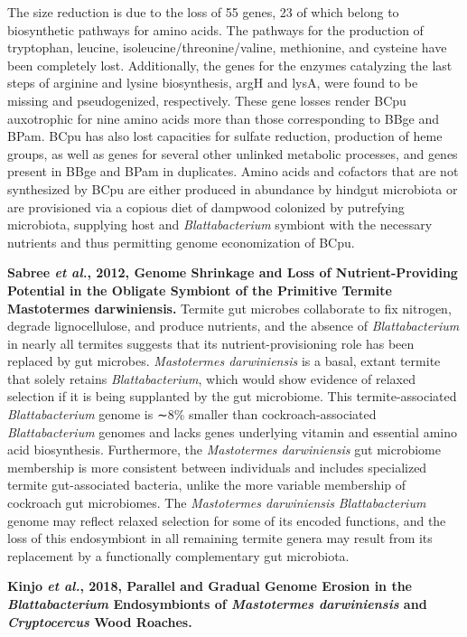 \documentclass[11pt]{article}
\begin{document}
\begin{sloppypar}
The size reduction is due to the loss of 55 genes, 23 of which belong to biosynthetic pathways for amino acids. 
The pathways for the production of tryptophan, leucine, isoleucine/threonine/valine, methionine, and cysteine have been completely lost. 
Additionally, the genes for the enzymes catalyzing the last steps of arginine and lysine biosynthesis, argH and lysA, were found to be missing and pseudogenized, respectively. 
These gene losses render BCpu auxotrophic for nine amino acids more than those corresponding to BBge and BPam. 
BCpu has also lost capacities for sulfate reduction, production of heme groups, as well as genes for several other unlinked metabolic processes, and genes present in BBge and BPam in duplicates. 
Amino acids and cofactors that are not synthesized by BCpu are either produced in abundance by hindgut microbiota or are provisioned via a copious diet of dampwood colonized by putrefying microbiota, supplying host and \textit{Blattabacterium} symbiont with the necessary nutrients and thus permitting genome economization of BCpu.
\par
\textbf{Sabree \textit{et al.}, 2012, Genome Shrinkage and Loss of Nutrient-Providing Potential in the Obligate Symbiont of the Primitive Termite Mastotermes darwiniensis.} \newline
Termite gut microbes collaborate to fix nitrogen, degrade lignocellulose, and produce nutrients, and the absence of \textit{Blattabacterium} in nearly all termites suggests that its nutrient-provisioning role has been replaced by gut microbes. 
\textit{Mastotermes darwiniensis} is a basal, extant termite that solely retains \textit{Blattabacterium}, which would show evidence of relaxed selection if it is being supplanted by the gut microbiome. 
This termite-associated \textit{Blattabacterium} genome is ∼8\% smaller than cockroach-associated \textit{Blattabacterium} genomes and lacks genes underlying vitamin and essential amino acid biosynthesis. 
Furthermore, the \textit{Mastotermes darwiniensis} gut microbiome membership is more consistent between individuals and includes specialized termite gut-associated bacteria, unlike the more variable membership of cockroach gut microbiomes. 
The \textit{Mastotermes darwiniensis} \textit{Blattabacterium} genome may reflect relaxed selection for some of its encoded functions, and the loss of this endosymbiont in all remaining termite genera may result from its replacement by a functionally complementary gut microbiota.
\par
\textbf{Kinjo \textit{et al.}, 2018, Parallel and Gradual Genome Erosion in the \textit{Blattabacterium} Endosymbionts of \textit{Mastotermes darwiniensis} and \textit{Cryptocercus} Wood Roaches.} \newline

\end{sloppypar}
\end{document}
